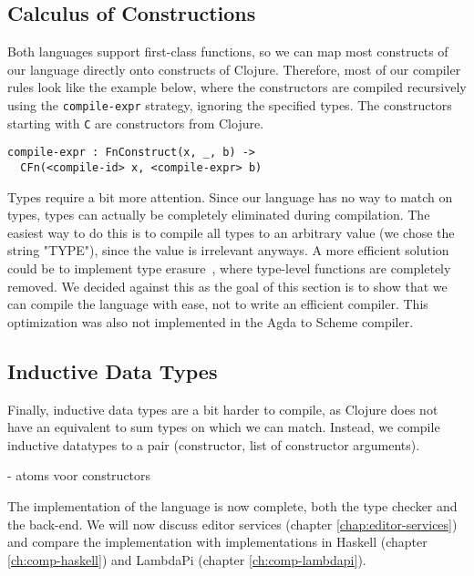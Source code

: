 \subsection{Calculus of Constructions}
Both languages support first-class functions, so we can map most constructs of our language directly onto constructs of Clojure. Therefore, most of our compiler rules look like the example below, where the constructors are compiled recursively using the \verb|compile-expr| strategy, ignoring the specified types. The constructors starting with \verb|C| are constructors from Clojure. 
\begin{lstlisting}
compile-expr : FnConstruct(x, _, b) -> 
  CFn(<compile-id> x, <compile-expr> b)
\end{lstlisting}

Types require a bit more attention. Since our language has no way to match on types, types can actually be completely eliminated during compilation. The easiest way to do this is to compile all types to an arbitrary value (we chose the string "TYPE"), since the value is irrelevant anyways. A more efficient solution could be to implement type erasure~\cite[Section 23.6]{tapl}, where type-level functions are completely removed. We decided against this as the goal of this section is to show that we can compile the language with ease, not to write an efficient compiler. This optimization was also not implemented in the Agda to Scheme compiler.

\subsection{Inductive Data Types}

Finally, inductive data types are a bit harder to compile, as Clojure does not have an equivalent to sum types on which we can match. Instead, we compile inductive datatypes to a pair (constructor, list of constructor arguments). 


- atoms voor constructors

The implementation of the language is now complete, both the type checker and the back-end. We will now discuss editor services (chapter \ref{chap:editor-services}) and compare the implementation with implementations in Haskell (chapter \ref{ch:comp-haskell}) and LambdaPi (chapter \ref{ch:comp-lambdapi}).